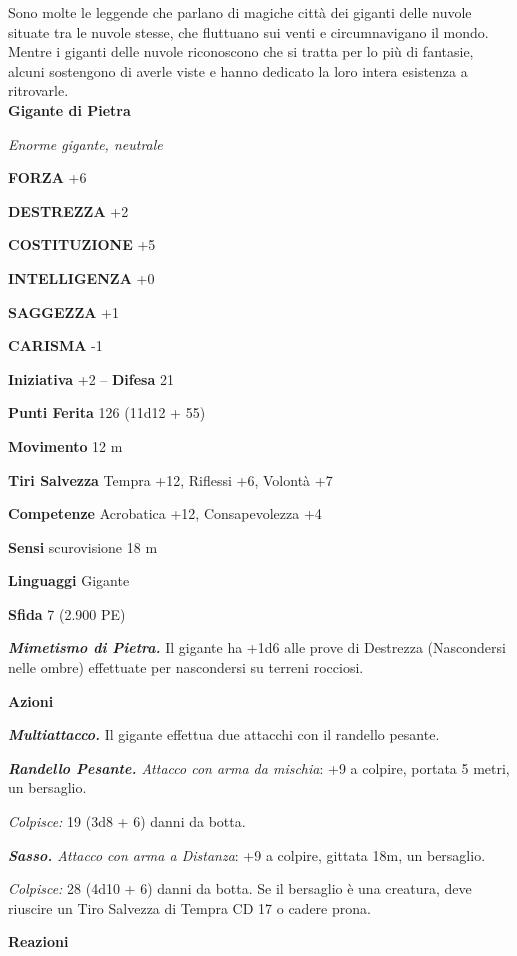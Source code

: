 \begin{multicols}{2}
Sono molte le leggende che parlano di magiche città dei giganti delle nuvole situate tra le nuvole stesse, che fluttuano sui venti e circumnavigano il mondo. Mentre i giganti delle nuvole riconoscono che si tratta per lo più di fantasie, alcuni sostengono di averle viste e hanno dedicato la loro intera esistenza a ritrovarle.\\


\medskip{}\textbf{Gigante di Pietra}

\emph{Enorme gigante, neutrale}

\textbf{FORZA} +6

\textbf{DESTREZZA} +2

\textbf{COSTITUZIONE} +5

\textbf{INTELLIGENZA} +0

\textbf{SAGGEZZA} +1

\textbf{CARISMA} -1

\textbf{Iniziativa} +2 -- \textbf{Difesa} 21

\textbf{Punti Ferita} 126 (11d12 + 55)

\textbf{Movimento} 12 m

\textbf{Tiri Salvezza} Tempra +12, Riflessi +6, Volontà +7

\textbf{Competenze} Acrobatica +12, Consapevolezza +4

\textbf{Sensi} scurovisione 18 m

\textbf{Linguaggi} Gigante

\textbf{Sfida} 7 (2.900 PE)

\emph{\textbf{Mimetismo di Pietra.}} Il gigante ha +1d6 alle prove di Destrezza (Nascondersi nelle ombre) effettuate per nascondersi su terreni rocciosi.

\textbf{Azioni}

\emph{\textbf{Multiattacco.}} Il gigante effettua due attacchi con il randello pesante.

\emph{\textbf{Randello Pesante.} Attacco con arma da mischia}: +9 a colpire, portata 5 metri, un bersaglio.

\emph{Colpisce:} 19 (3d8 + 6) danni da botta.

\emph{\textbf{Sasso.} Attacco con arma a Distanza}: +9 a colpire, gittata 18m, un bersaglio.

\emph{Colpisce:} 28 (4d10 + 6) danni da botta. Se il bersaglio è una creatura, deve riuscire un Tiro Salvezza di Tempra CD 17 o cadere prona.

\textbf{Reazioni}


\end{multicols}
